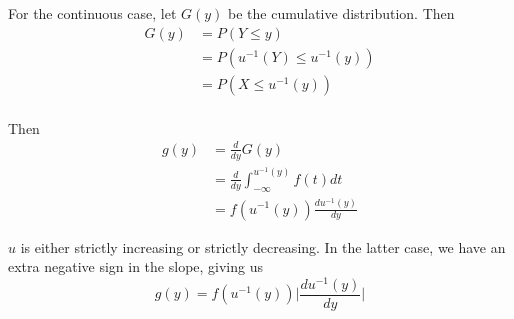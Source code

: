 \documentclass[12pt]{article}
\begin{document}
For the continuous case, let $G(y)$ be the cumulative distribution. Then
\begin{align*}
	G(y) &= P(Y\leq y) \\
	     &= P(u^{-1}(Y) \leq u^{-1}(y)) \\
	     &= P(X\leq u^{-1}(y)) \\
\end{align*}

Then
\begin{align*}
	g(y) &= \frac{d}{dy}G(y) \\
	     &= \frac{d}{dy}\int_{-\infty}^{u^{-1}(y)} f(t)dt \\
	     &= f(u^{-1}(y))\frac{du^{-1}(y)}{dy}
\end{align*}

$u$ is either strictly increasing or strictly decreasing. In the latter case, we have an extra negative sign in the slope, giving us
$$g(y) = f(u^{-1}(y))\Bigg |\frac{du^{-1}(y)}{dy} \Bigg |$$
\end{document}
